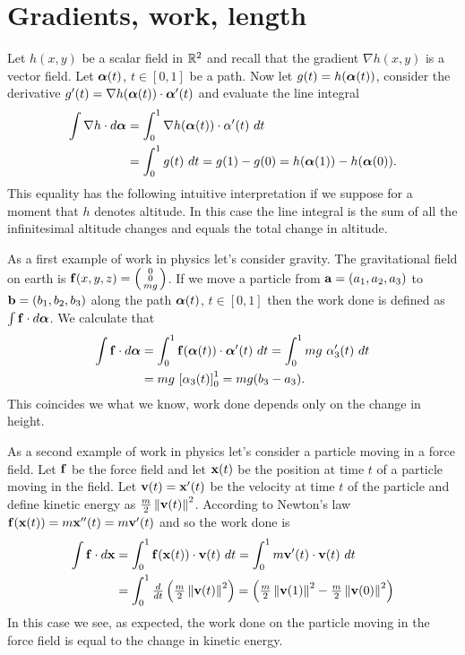 \section{Gradients, work, length}

Let \(h(x,y)\) be a scalar field in \(\bR^2\)
and recall that the gradient \(\nabla h(x,y)\) is a vector field.
Let \(\aalpha(t)\), \(t\in [0,1]\) be a path.
Now let \(g(t) = h(\aalpha(t))\), consider the derivative
\(g'(t) = \nabla h(\aalpha(t))\cdot \aalpha'(t)\)
and evaluate the line integral
\[
    \begin{aligned}
        \int \nabla h \cdot d\aalpha
         & = \int_0^1 \nabla h(\aalpha(t)) \cdot \alpha'(t)\ dt \\
         & = \int_0^1 g(t) \ dt
        = g(1) - g(0)
        = h(\aalpha(1)) - h(\aalpha(0)).
    \end{aligned}
\]
This equality has the following intuitive interpretation if we suppose for a moment that \(h\) denotes altitude.
In this case the line integral is the sum of all the infinitesimal altitude changes and equals the total change in altitude.

As a first example of work in physics let's consider gravity.
The gravitational field on earth is \(\ff(x,y,z) = \left(\begin{smallmatrix}
        0 \\ 0 \\ mg
    \end{smallmatrix}\right)\).
If we move a particle from \(\aa=(a_1,a_2,a_3)\) to \(\bb=(b_1,b_2,b_3)\) along the path \(\aalpha(t)\), \(t\in [0,1]\)
then the work done is defined as \(\int \ff \cdot d\aalpha\).
We calculate that
\[
    \begin{aligned}
        \int \ff \cdot d\aalpha
         & = \int_0^1 \ff(\aalpha(t)) \cdot \aalpha'(t) \ dt
        = \int_0^1 mg \ \alpha_3'(t) \ dt                          \\
         & = mg \ {\left[ \alpha_3(t)\right]}_0^1 = mg(b_3 - a_3).
    \end{aligned}
\]
This coincides we what we know, work done depends only on the change in height.

As a second example of work in physics let's consider a particle moving in a force field.
Let \(\ff\) be the force field and let \(\xx(t)\) be the position at time \(t\) of a particle moving in the field.
Let \(\vv(t) = \xx'(t)\) be the velocity at time \(t\) of the particle and define kinetic energy as \(\frac{m}{2} \norm{\vv(t)}^2\).
According to Newton's law
\(\ff(\xx(t)) = m\xx''(t) = m \vv'(t)\)
and so the work done is
\[
    \begin{aligned}
        \int \ff \cdot d\xx
         & = \int_0^1 \ff(\xx(t)) \cdot \vv(t) \ dt
        = \int_0^1 m\vv'(t) \cdot \vv(t) \ dt                                   \\
         & = \int_0^1 \tfrac{d}{dt} \left( \tfrac{m}{2} \norm{\vv(t)}^2 \right)
        = \left(  \tfrac{m}{2} \norm{\vv(1)}^2  -  \tfrac{m}{2} \norm{\vv(0)}^2   \right)
    \end{aligned}
\]
In this case we see, as expected, the work done on the particle moving in the force field is equal to the change in kinetic energy.

